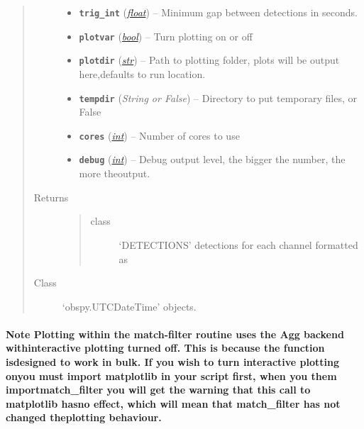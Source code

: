 \documentclass[a4paper,10pt,english]{sphinxmanual}
\begin{document}
\begin{fulllineitems}
\begin{quote}
\begin{description}
\begin{itemize}
\item {} 
\textbf{\texttt{trig\_int}} (\href{https://docs.python.org/library/functions.html\#float}{\emph{float}}) -- Minimum gap between detections in seconds.

\item {} 
\textbf{\texttt{plotvar}} (\href{https://docs.python.org/library/functions.html\#bool}{\emph{bool}}) -- Turn plotting on or off

\item {} 
\textbf{\texttt{plotdir}} (\href{https://docs.python.org/library/functions.html\#str}{\emph{str}}) -- Path to plotting folder, plots will be output here,defaults to run location.

\item {} 
\textbf{\texttt{tempdir}} (\emph{String or False}) -- Directory to put temporary files, or False

\item {} 
\textbf{\texttt{cores}} (\href{https://docs.python.org/library/functions.html\#int}{\emph{int}}) -- Number of cores to use

\item {} 
\textbf{\texttt{debug}} (\href{https://docs.python.org/library/functions.html\#int}{\emph{int}}) -- Debug output level, the bigger the number, the more theoutput.

\end{itemize}

\item[{Returns}] \leavevmode
\begin{quote}\begin{description}
\item[{class}] \leavevmode
`DETECTIONS' detections for each channel formatted as

\end{description}\end{quote}


\item[{Class}] \leavevmode
`obspy.UTCDateTime' objects.

\end{description}\end{quote}
\paragraph{Note
Plotting within the match-filter routine uses the Agg backend withinteractive plotting turned off.  This is because the function isdesigned to work in bulk.  If you wish to turn interactive plotting onyou must import matplotlib in your script first, when you them importmatch\_filter you will get the warning that this call to matplotlib hasno effect, which will mean that match\_filter has not changed theplotting behaviour.}

\end{fulllineitems}
\end{document}
